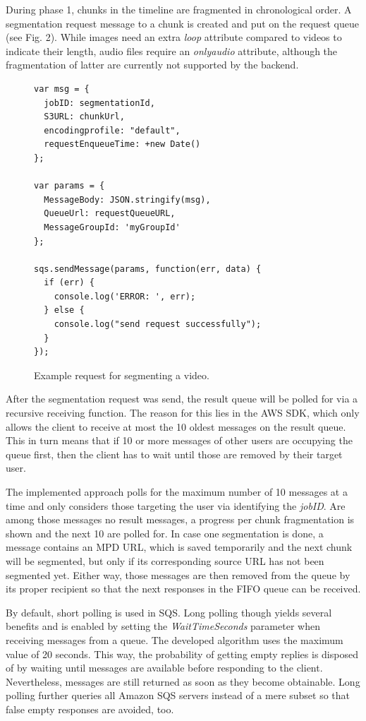 \documentclass[conference]{IEEEtran}
\begin{document}
During phase 1, chunks in the timeline are fragmented in chronological order.
A segmentation request message to a chunk is created and put on the request queue (see Fig. 2). While images need an extra \textit{loop} attribute compared to videos to indicate their length, audio files require an \textit{onlyaudio} attribute, although the fragmentation of latter are currently not supported by the backend.
\begin{figure}[H]
\begin{lstlisting}
var msg = {
  jobID: segmentationId,
  S3URL: chunkUrl,
  encodingprofile: "default",
  requestEnqueueTime: +new Date()
};

var params = {
  MessageBody: JSON.stringify(msg),
  QueueUrl: requestQueueURL,
  MessageGroupId: 'myGroupId'
};

sqs.sendMessage(params, function(err, data) {
  if (err) {
    console.log('ERROR: ', err);
  } else {
    console.log("send request successfully");
  }
});
\end{lstlisting}
\caption{Example request for segmenting a video.}
\end{figure}
After the segmentation request was send, the result queue will be polled for via a recursive receiving function.
The reason for this lies in the AWS SDK, which only allows the client to receive at most the 10 oldest messages on the result queue.
This in turn means that if 10 or more messages of other users are occupying the queue first, then the client has to wait until those are removed by their target user. 

The implemented approach polls for the maximum number of 10 messages at a time and only considers those targeting the user via identifying the \textit{jobID}.
Are among those messages no result messages, a progress per chunk fragmentation is shown and the next 10 are polled for.
In case one segmentation is done, a message contains an MPD URL, which is saved temporarily and the next chunk will be segmented, but only if its corresponding source URL has not been segmented yet.
Either way, those messages are then removed from the queue by its proper recipient so that the next responses in the FIFO queue can be received.

By default, short polling is used in SQS.
Long polling though yields several benefits and is enabled by setting the \textit{WaitTimeSeconds} parameter when receiving messages from a queue.
The developed algorithm uses the maximum value of 20 seconds.
This way, the probability of getting empty replies is disposed of by waiting until messages are available before responding to the client.
Nevertheless, messages are still returned as soon as they become obtainable.
Long polling further queries all Amazon SQS servers instead of a mere subset so that false empty responses are avoided, too.
\\
\end{document}
